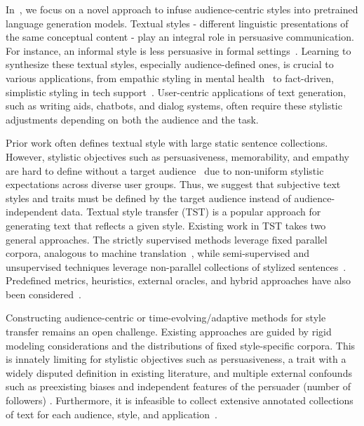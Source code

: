 In~, we focus on a novel approach to infuse audience-centric styles into pretrained language generation models. Textual styles - \ie different linguistic presentations of the same conceptual content - play an integral role in persuasive communication. For instance, an informal style is less persuasive in formal settings~\citep{kim2019comparing}. Learning to synthesize these textual styles, especially audience-defined ones, is crucial to various applications, from empathic styling in mental health~\citep{cameron2018assessing} to fact-driven, simplistic styling in tech support~\citep{okuda2018ai}. User-centric applications of text generation, such as writing aids, chatbots, and dialog systems, often require these stylistic adjustments depending on both the audience and the task. 

Prior work often defines textual style with large static sentence collections. However, stylistic objectives such as persuasiveness, memorability, and empathy are hard to define without a target audience~\citep{bell1984style} due to non-uniform stylistic expectations across diverse user groups. Thus, we suggest that subjective text styles and traits must be defined by the target audience instead of audience-independent data. Textual style transfer (TST) is a popular approach for generating text that reflects a given style. Existing work in TST takes two general approaches. The strictly supervised methods leverage fixed parallel corpora, analogous to machine translation~\citep{hu2017toward}, while semi-supervised and unsupervised techniques leverage non-parallel collections of stylized sentences~\citep{shen2017style}. Predefined metrics, heuristics, external oracles, and hybrid approaches have also been considered~\citep{jain2019unsupervised, jin2019imat}.


Constructing audience-centric or time-evolving/adaptive methods for style transfer remains an open challenge. Existing approaches are guided by rigid modeling considerations and the distributions of fixed style-specific corpora. This is innately limiting for stylistic objectives such as persuasiveness, a trait with a widely disputed definition in existing literature, and multiple external confounds such as preexisting biases and independent features of the persuader (\eg number of followers) \citep{al-khatib-etal-2020-exploiting,moran-2016,lowrey-1998, berger-2012,murphy-2001}. Furthermore, it is infeasible to collect extensive annotated collections of text for each audience, style, and application~\citep{pennebaker1999linguistic}. 


